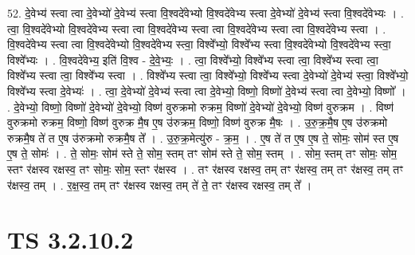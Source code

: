 \documentclass[17pt]{extarticle}
\begin{document}
52. दे॒वेभ्य॑ स्त्वा त्वा दे॒वेभ्यो॑ दे॒वेभ्य॑ स्त्वा वि॒श्वदे॑वेभ्यो वि॒श्वदे॑वेभ्य स्त्वा दे॒वेभ्यो॑ दे॒वेभ्य॑ स्त्वा वि॒श्वदे॑वेभ्यः । . त्वा॒ वि॒श्वदे॑वेभ्यो वि॒श्वदे॑वेभ्य स्त्वा त्वा वि॒श्वदे॑वेभ्य स्त्वा त्वा वि॒श्वदे॑वेभ्य स्त्वा त्वा वि॒श्वदे॑वेभ्य स्त्वा । . वि॒श्वदे॑वेभ्य स्त्वा त्वा वि॒श्वदे॑वेभ्यो वि॒श्वदे॑वेभ्य स्त्वा॒ विश्वे᳚भ्यो॒ विश्वे᳚भ्य स्त्वा वि॒श्वदे॑वेभ्यो वि॒श्वदे॑वेभ्य स्त्वा॒ विश्वे᳚भ्यः । . वि॒श्वदे॑वेभ्य॒ इति॑ वि॒श्व - दे॒वे॒भ्यः॒ । . त्वा॒ विश्वे᳚भ्यो॒ विश्वे᳚भ्य स्त्वा त्वा॒ विश्वे᳚भ्य स्त्वा त्वा॒ विश्वे᳚भ्य स्त्वा त्वा॒ विश्वे᳚भ्य स्त्वा । . विश्वे᳚भ्य स्त्वा त्वा॒ विश्वे᳚भ्यो॒ विश्वे᳚भ्य स्त्वा दे॒वेभ्यो॑ दे॒वेभ्य॑ स्त्वा॒ विश्वे᳚भ्यो॒ विश्वे᳚भ्य स्त्वा दे॒वेभ्यः॑ । . त्वा॒ दे॒वेभ्यो॑ दे॒वेभ्य॑ स्त्वा त्वा दे॒वेभ्यो॒ विष्णो॒ विष्णो॑ दे॒वेभ्य॑ स्त्वा त्वा दे॒वेभ्यो॒ विष्णो᳚ । . दे॒वेभ्यो॒ विष्णो॒ विष्णो॑ दे॒वेभ्यो॑ दे॒वेभ्यो॒ विष्ण॑ वुरुक्रमो रुक्रम॒ विष्णो॑ दे॒वेभ्यो॑ दे॒वेभ्यो॒ 
विष्ण॑ वुरुक्रम । . विष्ण॑ वुरुक्रमो रुक्रम॒ विष्णो॒ विष्ण॑ वुरुक्र मै॒ष ए॒ष उ॑रुक्रम॒ विष्णो॒ विष्ण॑ वुरुक्र मै॒षः । . उ॒रु॒क्र॒मै॒ष ए॒ष उ॑रुक्रमो रुक्रमै॒ष ते॑ त ए॒ष उ॑रुक्रमो रुक्रमै॒ष ते᳚ । . उ॒रु॒क्र॒मेत्यु॑रु - क्र॒म॒ । . ए॒ष ते॑ त ए॒ष ए॒ष ते॒ सोमः॒ सोम॑ स्त ए॒ष ए॒ष ते॒ सोमः॑ । . ते॒ सोमः॒ सोम॑ स्ते ते॒ सोम॒ स्तम् तꣳ सोम॑ स्ते ते॒ सोम॒ स्तम् । . सोम॒ स्तम् तꣳ सोमः॒ सोम॒ स्तꣳ र॑क्षस्व रक्षस्व॒ तꣳ सोमः॒ सोम॒ स्तꣳ र॑क्षस्व । . तꣳ र॑क्षस्व रक्षस्व॒ तम् तꣳ र॑क्षस्व॒ तम् तꣳ र॑क्षस्व॒ तम् तꣳ र॑क्षस्व॒ तम् । . र॒क्ष॒स्व॒ तम् तꣳ र॑क्षस्व रक्षस्व॒ तम् ते॑ ते॒ तꣳ र॑क्षस्व रक्षस्व॒ तम् ते᳚ । \newline
\pagebreak
{}

\section{ TS 3.2.10.2 }
\end{document}
